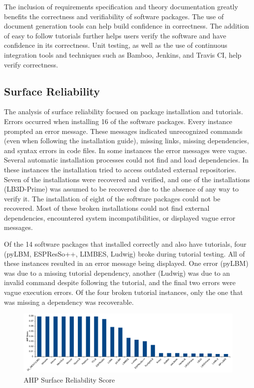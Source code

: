 \documentclass[final, 3p, times, authoryear]{elsarticle}
\begin{document}
The inclusion of requirements specification and theory documentation greatly
benefits the correctness and verifiability of software packages. The use of
document generation tools can help build confidence in correctness. The addition
of easy to follow tutorials further helps users verify the software and have
confidence in its correctness. Unit testing, as well as the use of continuous
integration tools and techniques such as Bamboo, Jenkins, and Travis CI, help
verify correctness.

\subsection{Surface Reliability}

The analysis of surface reliability focused on package installation and
tutorials. Errors occurred when installing 16 of the software packages. Every
instance prompted an error message. These messages indicated unrecognized
commands (even when following the installation guide), missing links, missing
dependencies, and syntax errors in code files. In some instances the error messages were vague. Several automatic installation processes could not find and load dependencies. In these instances the installation tried to access outdated external repositories. Seven of the installations were recovered and verified, and one of the installations (LB3D-Prime) was assumed to be recovered due to the absence of any way to verify it. The installation of eight of the software packages could not be recovered. Most of these broken installations could not find external dependencies, encountered system incompatibilities, or displayed vague error messages. 

Of the 14 software packages that installed correctly and also have tutorials,
four (pyLBM, ESPResSo++, LIMBES, Ludwig) broke during tutorial testing. All of
these instances resulted in an error message being displayed. One error (pyLBM)
was due to a missing tutorial dependency, another (Ludwig) was due to an invalid
command despite following the tutorial, and the final two errors were vague
execution errors. Of the four broken tutorial instances, only the one that was
missing a dependency was recoverable. 

\begin{figure}[h!]
	\begin{center}
		\includegraphics[width=1.0\textwidth]{./figures/reliability_chart.pdf}
		\caption{AHP Surface Reliability Score}
		\label{Fig_Reliability}
	\end{center}
\end{figure}
\end{document}
